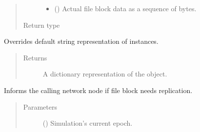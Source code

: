 \documentclass[letterpaper,10pt,english]{sphinxmanual}
\begin{document}
\begin{fulllineitems}
\begin{fulllineitems}
\begin{quote}
\begin{description}
\begin{itemize}
\item {} 
 () \textendash{} Actual file block data as a sequence of bytes.

\end{itemize}

\item[{Return type}] \leavevmode
{}

\end{description}\end{quote}

\end{fulllineitems}


\begin{fulllineitems}
\label{\detokenize{app.domain.helpers:app.domain.helpers.smart_dataclasses.FileBlockData.__str__}}
Overrides default string representation of  instances.
\begin{quote}\begin{description}
\item[{Returns}] \leavevmode
A dictionary representation of the object.

\end{description}\end{quote}

\end{fulllineitems}


\begin{fulllineitems}
\label{\detokenize{app.domain.helpers:app.domain.helpers.smart_dataclasses.FileBlockData.can_replicate}}
Informs the calling network node if file block needs replication.
\begin{quote}\begin{description}
\item[{Parameters}] \leavevmode
{} () \textendash{} Simulation’s current epoch.


\end{description}
\end{quote}
\end{fulllineitems}
\end{fulllineitems}
\end{document}
